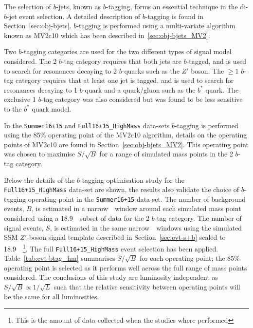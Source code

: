 The selection of $b$-jets, known as $b$-tagging,
forms an essential technique in the di-$b$-jet event selection.
A detailed description of $b$-tagging is found in Section~\ref{sec:obj-bjets}.
$b$-tagging is performed using a multi-variate algorithm known as MV2c10 which has been described in~\ref{sec:obj-bjets_MV2}.

Two $b$-tagging categories are used for the two different types of signal model considered.
The 2 $b$-tag category requires that both jets are $b$-tagged,
and is used to search for resonances decaying to 2 $b$-quarks such as the $Z'$ boson.
The $\geq 1$ $b$-tag category requires that at least one jet is tagged,
and is used to search for resonances decaying to 1 $b$-quark and a quark/gluon such as the $b^*$ quark.
The exclusive 1 $b$-tag category was also considered but was found to be less sensitive to the $b^*$ quark model.

In the \verb|Summer16+15| and \verb|Full16+15_HighMass| data-sets
$b$-tagging is performed using the 85\% operating point of the MV2c10 algorithm,
details on the operating points of MV2c10 are found in Section~\ref{sec:obj-bjets_MV2}.
This operating point was chosen to maximise $S/\sqrt{B}$ for a range of simulated mass points in the 2 $b$-tag category.

Below the details of the $b$-tagging optimisation study for the \verb|Full16+15_HighMass| data-set are shown,
the results also validate the choice of $b$-tagging operating point in the \verb|Summer16+15| data-set.
The number of background events, $B$, is estimated in
a narrow~\mjj~window around
each simulated mass point considered using a
18.9~\ifb~subset of data for the 2 $b$-tag category.
The number of signal events, $S$, is estimated
in the same narrow~\mjj~windows using 
the simulated SSM $Z'$-boson signal template
described in Section~\ref{sec:evt-s+b} scaled to 18.9~\ifb~\footnote{This is
  the amount of data collected when the studies where performed}.
The full \verb|Full16+15_HighMass| event selection has been applied.
Table~\ref{tab:evt-btag_hm} summarises $S/\sqrt{B}$ for each operating point;
the 85\% operating point is selected as it performs well across the full range of mass points considered.
The conclusions of this study are luminosity independent
as $S/\sqrt{B} \propto 1/\sqrt{L}$ such that the relative sensitivity
between operating points will be the same for all luminosities.

